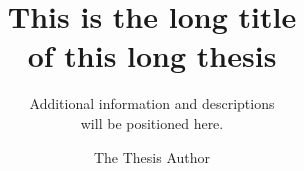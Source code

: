 
%


\usepackage[darkcyan]{style/general_layout} %
\usepackage{style/titlepage}
\usepackage{style/coverpage}
\usepackage{style/TOC}

\title{This is the long title \\of this long thesis}
\subtitle{Additional information and descriptions\\will be positioned here.}
\author{The Thesis Author}
\date{\tomorrow}


    \makecover
    \maketitle
    \cleardoublepage %
    
    
    \tableofcontents
    \cleardoublepage
    \newpage
    
    
    
    
    
    
    \appendix
    
    \printbibliography
    
    
